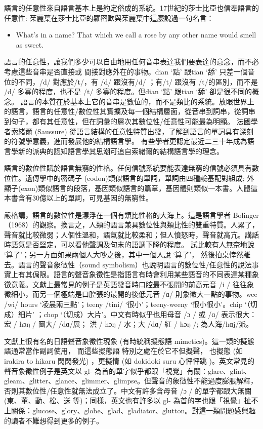 語言的任意性來自語言基本上是約定俗成的系統。17世紀的莎士比亞也信奉語言的任意性: 茱麗葉在莎士比亞的羅密歐與茱麗葉中這麼說過一句名言：

\begin{itemize}
\item What’s in a name? That which we call a rose by any other name would                           smell as sweet.  

\end{itemize}

語言的任意性，讓我們多少可以自由地用任何音串表達我們要表達的意念，而不必考慮這些音串是否直接或 間接對應外在的事物。dian ‘點’ 跟tian ‘舔’  只差一個音位的不同，/d/  對應於/t/，有 /d/  跟沒有/d/ ；有/t/  跟沒有  /t/的區別，而不是  /d/  多寡的程度，也不是 /t/ 多寡的程度。但dian ‘點’ 跟tian ‘舔’  卻是很不同的概念。  語言的本質在於基本上它的音串是數位的，而不是類比的系統。放眼世界上的語言，語言的任意性/數位性其實擴及每一個結構層面，從音串到詞串，從詞串到句子，都有其任意性，但在詞彙的層次其數位性/任意性可能最為明顯。 法國學者索緒爾 (Saussure) 從語言結構的任意性特質出發，了解到語言的單詞具有深刻的符號學意義，進而發展他的結構語言學。 有些學者更認定最近二三十年成為語言學新的派典的認知語言學其思潮可追自索緒爾的結構語言學的理念。

語言的數位性賦於語言無窮的性格。任何信號系統要能表達無窮的信號必須具有數位性。遺傳學中的密碼子 (codon)類似語言的單詞，單詞由四種鹼基配對組成; 外顯子(exon)類似語言的段落，基因類似語言的篇章，基因體則類似一本書。人體這本書含有30億以上的單詞，可見基因的無窮性。

嚴格講，語言的數位性是漂浮在一個有類比性格的大海上。這是語言學者 Bolinger（1968）的觀察。換言之，人類的語言兼具數位性與類比性的雙重特質。人累了，聲音就比較微弱；人個性溫和，語氣就比較柔和；但人憤怒時，聲音就高亢。講話時語氣是否堅定，可以看他聲調及句末的語調下降的程度。 試比較有人無奈地說 ‘算了’；另一方面如果兩個人大吵之後，其中一個人說 ‘算了’， 然後拍桌悻然離去。語言的聲音象徵性（sound symbolism）也說明語言的數位性/任意性的說法事實上有其侷限。語言的聲音象徵性是指語言有時會利用某些語音的不同表達某種象徵意義。文獻上最常見的例子是英語發音時口腔最不張開的前高元音 /i /  往往象徵細小，而另一個極端是口腔張的最開的後低元音  /ɑ/  則象徵大一點的事物。wee /wi/ hours ‘凌晨兩三點’；teeny /tini/  ‘很小’；teeny-weeny ‘很小很小’。chip ‘（切成）細片’ ；chop ‘（切成）大片’。中文有時似乎也用母音 /ɔ / 或 /ɑ/ 表示很大： 宏 / hɔŋ /  圖大/ /dɑ/展； 洪 / hɔŋ / 水；大 /dɑ/ 紅 / hɔŋ /; 為人海/hɑj/派。

文獻上很有名的日語聲音象徵性現象 (有時統稱擬態語 mimetics)。這一類的擬態語通常當作副詞使用， 而這些擬態語 特別之處在於它不但擬聲， 也擬態 (如 irakira to hikaru 閃閃發光) ，更擬情 (如 dokidoki suru 心怦怦跳 )。英文常見的聲音象徵性例子是英文以 gl-  為首的單字似乎都跟「視覺」有關：glare、glint、gleam、glitter、glance、glimmer、glimpse。但聲音的象徵性不能過度膨脹解釋，否則其數位性/任意性就無法成立了。中文有許多含母音 /ɔ /  的單字都跟大無關 (東、董、動、松、送 等)；同樣，英文也有許多以 gl-  為首的字也跟「視覺」扯不上關係：glucose、glory、globe、glad、gladiator、glutton。對這一類問題感興趣的讀者不難想得到更多的例子。


